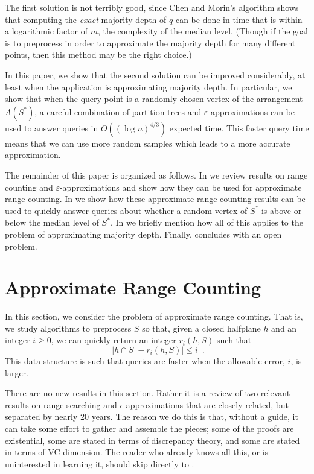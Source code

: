 \documentclass{patmorin}
\newcommand{\eps}{\varepsilon}
\begin{document}
The first solution is not terribly good, since Chen and Morin's algorithm
shows that computing the \emph{exact} majority depth of $q$ can be done
in time that is within a logarithmic factor of $m$, the complexity of
the median level.  (Though if the goal is to preprocess in order to
approximate the majority depth for many different points, then this
method may be the right choice.)

In this paper, we show that the second solution can be improved
considerably, at least when the application is approximating majority
depth.  In particular, we show that when the query point is a randomly
chosen vertex of the arrangement $A(S^*)$, a careful combination of
partition trees \cite{c12} and $\eps$-approximations \cite{mww93}
can be used to answer queries in $O((\log n)^{4/3})$ expected time.
This faster query time means that we can use more random samples which
leads to a more accurate approximation.

The remainder of this paper is organized as follows.  In
 we review results on range counting and
$\eps$-approximations and show how they can be used for approximate range
counting.  In  we show how these approximate range
counting results can be used to quickly answer queries about whether
a random vertex of $S^*$ is above or below the median level of $S^*$.
In  we briefly mention how all of this applies to
the problem of approximating majority depth.  Finally, 
concludes with an open problem.

\section{Approximate Range Counting}

In this section, we consider the problem of approximate range counting.
That is, we study algorithms to preprocess $S$ so that, given a closed
halfplane $h$ and an integer $i\ge 0$, we can quickly return an integer
$r_i(h,S)$ such that
\[
   \left| |h\cap S| - r_i(h,S)\right| \le i \enspace .
\]
This data structure is such that queries are faster when the allowable
error, $i$, is larger.

There are no new results in this section. Rather it is a review of two
relevant results on range searching and $\epsilon$-approximations that are
closely related, but separated by nearly 20 years.  The reason we do this
is that, without a guide, it can take some effort to gather and assemble
the pieces; some of the proofs are existential, some are stated in terms
of discrepancy theory, and some are stated in terms of VC-dimension.
The reader who already knows all this, or is uninterested in learning it,
should skip directly to .
\end{document}
